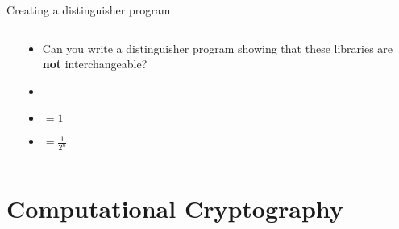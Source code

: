 \documentclass[aspectratio=169, lualatex, handout]{beamer}
\begin{document}
\begin{frame}{Creating a distinguisher program}
	\begin{columns}[c]
		\begin{column}{0.5\textwidth}
			\begin{center}
			\end{center}
		\end{column}
		\begin{column}{0.5\textwidth}
			\begin{itemize}
				\item Can you write a distinguisher program showing that these libraries are \textbf{not} interchangeable?
				      \pause
				\item {}
				\item {} $= 1$
				\item {} $= \frac{1}{2^n}$
			\end{itemize}
		\end{column}
	\end{columns}
\end{frame}

\section{Computational Cryptography}
\end{document}
